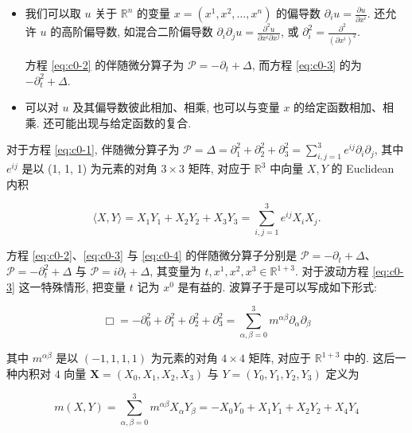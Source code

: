 \begin{itemize}
\item 我们可以取 $u$ 关于 $\mathbb{R}^{n}$ 的变量 $x = (x^{1}, x^{2}, \ldots, x^{n})$ 的偏导数 $\partial_{i} u = \frac{\partial u}{\partial x^{i}}$.
还允许 $u$ 的高阶偏导数, 如混合二阶偏导数 $\partial_{i} \partial_{j} u = \frac{\partial^{2} u}{\partial x^{i} \partial x^{j}}$, 或 $\partial_{i}^{2} = \frac{\partial^{2}}{(\partial x^{i})^{2}}$.

方程 \eqref{eq:c0-2} 的伴随微分算子为 $\mathcal{P} = -\partial_{t} + \Delta$, 而方程 \eqref{eq:c0-3} 的为 $-\partial_{t}^{2} + \Delta$.
\item 可以对 $u$ 及其偏导数彼此相加、相乘, 也可以与变量 $x$ 的给定函数相加、相乘.
还可能出现与给定函数的复合.
\end{itemize}

对于方程 \eqref{eq:c0-1}, 伴随微分算子为 $\mathcal{P} = \Delta = \partial_{1}^{2} + \partial_{2}^{2} + \partial_{3}^{2} = \sum_{i, j = 1}^{3} e^{i j} \partial_{i} \partial_{j}$, 其中 $e^{i j}$ 是以 (1, 1, 1) 为元素的对角 $3 \times 3$ 矩阵, 对应于 $\mathbb{R}^{3}$ 中向量 $X, Y$ 的 Euclidean 内积

\begin{equation}\label{eq:c0-7}
\langle X, Y \rangle = X_{1} Y_{1} + X_{2} Y_{2} + X_{3} Y_{3} = \sum_{i, j = 1}^{3} e^{i j} X_{i} X_{j}.
\end{equation}

方程 \eqref{eq:c0-2}、\eqref{eq:c0-3} 与 \eqref{eq:c0-4} 的伴随微分算子分别是 $\mathcal{P} = -\partial_{t} + \Delta$、$\mathcal{P} = -\partial_{t}^{2} + \Delta$ 与 $\mathcal{P} = i \partial_{t} + \Delta$, 其变量为 $t, x^{1}, x^{2}, x^{3} \in \mathbb{R}^{1+3}$.
对于波动方程 \eqref{eq:c0-3} 这一特殊情形, 把变量 $t$ 记为 $x^{0}$ 是有益的.
波算子于是可以写成如下形式:

\begin{equation}\label{eq:c0-8}
\Box = -\partial_{0}^{2} + \partial_{1}^{2} + \partial_{2}^{2} + \partial_{3}^{2} = \sum_{\alpha, \beta = 0}^{3} m^{\alpha \beta} \partial_{\alpha} \partial_{\beta}
\end{equation}

其中 $m^{\alpha \beta}$ 是以 $(-1, 1, 1, 1)$ 为元素的对角 $4 \times 4$ 矩阵, 对应于 $\mathbb{R}^{1+3}$ 中的.
这后一种内积对 $4$ 向量 $\boldsymbol{X} = (X_{0}, X_{1}, X_{2}, X_{3})$ 与 $Y = (Y_{0}, Y_{1}, Y_{2}, Y_{3})$ 定义为

\begin{equation}\label{eq:c0-9}
m(X, Y) = \sum_{\alpha, \beta = 0}^{3} m^{\alpha \beta} X_{\alpha} Y_{\beta} = -X_{0} Y_{0} + X_{1} Y_{1} + X_{2} Y_{2} + X_{4} Y_{4}
\end{equation}

